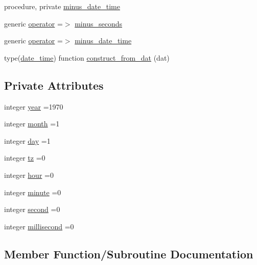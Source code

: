 \begin{DoxyCompactItemize}
procedure, private \mbox{\hyperlink{structm__time__oop_1_1date__time_a17a93aedcafb0f53d434cd5acda5afbe}{minus\+\_\+date\+\_\+time}}
\item 
generic \mbox{\hyperlink{structm__time__oop_1_1date__time_a1bc7a5d0ab4bd7539e7ec7bafd6dc572}{operator}} =$>$ \mbox{\hyperlink{structm__time__oop_1_1date__time_a249eca2a35ca6e19bc97e023545260ea}{minus\+\_\+seconds}}
\item 
generic \mbox{\hyperlink{structm__time__oop_1_1date__time_a4c3515896bef8d410b6e010b033296c0}{operator}} =$>$ \mbox{\hyperlink{structm__time__oop_1_1date__time_a17a93aedcafb0f53d434cd5acda5afbe}{minus\+\_\+date\+\_\+time}}
\item 
type(\mbox{\hyperlink{structm__time__oop_1_1date__time}{date\+\_\+time}}) function \mbox{\hyperlink{structm__time__oop_1_1date__time_a7f2959e5ec90cec4912df6ec3df9a5f5}{construct\+\_\+from\+\_\+dat}} (dat)
\end{DoxyCompactItemize}
\subsection*{Private Attributes}
\begin{DoxyCompactItemize}
\item 
integer \mbox{\hyperlink{structm__time__oop_1_1date__time_a5dfd54357865af0909ec68dff0326306}{year}} =1970
\item 
integer \mbox{\hyperlink{structm__time__oop_1_1date__time_a72c52c8c8474563233a3661177a8e745}{month}} =1
\item 
integer \mbox{\hyperlink{structm__time__oop_1_1date__time_a0f87e80bd7957cdb79d1ae870d2b791a}{day}} =1
\item 
integer \mbox{\hyperlink{structm__time__oop_1_1date__time_ad0338a670b1fa55ff5da4ece0762bd4e}{tz}} =0
\item 
integer \mbox{\hyperlink{structm__time__oop_1_1date__time_a399cdf34783e31997a3d56fda5c318cf}{hour}} =0
\item 
integer \mbox{\hyperlink{structm__time__oop_1_1date__time_a3f16e3293366410be6af1b905d321bba}{minute}} =0
\item 
integer \mbox{\hyperlink{structm__time__oop_1_1date__time_ab1361dc651eb8faf1b176c175f308ba1}{second}} =0
\item 
integer \mbox{\hyperlink{structm__time__oop_1_1date__time_a1c760217b22efc06b23944d464c57907}{millisecond}} =0
\end{DoxyCompactItemize}


\subsection{Member Function/\+Subroutine Documentation}
\mbox{\label{structm__time__oop_1_1date__time_a7f2959e5ec90cec4912df6ec3df9a5f5}} 
